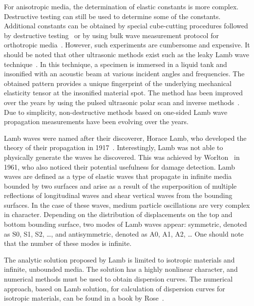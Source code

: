 \documentclass[preprint,12pt]{elsarticle}
\begin{document}
	For anisotropic media, the determination of elastic constants is more complex. Destructive testing can still be used to determine some of the constants. Additional constants can be obtained by special cube-cutting procedures followed by destructive testing~\cite{Rose1991} or by using bulk wave measurement protocol for orthotropic media~\cite{Rose1999}. However, such experiments are cumbersome and expensive.  It should be noted that other ultrasonic methods exist such as the leaky Lamb wave technique~\cite{Karim1990,Karim1990a}. In this technique, a specimen is immersed in a liquid tank and insonified with an acoustic beam at various incident angles and frequencies. The obtained pattern provides a unique fingerprint of the underlying mechanical elasticity tensor at the insonified material spot. The method has been improved over the years by using the pulsed ultrasonic polar scan and inverse methods~\cite{Kersemans2014,Martens2017}. Due to simplicity, non-destructive methods based on one-sided Lamb wave propagation measurements have been evolving over the years.

	Lamb waves were named after their discoverer, Horace Lamb, who developed the theory of their propagation in 1917~\cite{Lamb1917}. Interestingly, Lamb was not able to physically generate the waves he discovered. This was achieved by Worlton~\cite{Worlton1961} in 1961, who also noticed their potential usefulness for damage detection. Lamb waves are defined as a type of elastic waves that propagate in infinite media bounded by two surfaces and arise as a result of the superposition of multiple reflections of longitudinal waves and shear vertical waves from the bounding surfaces. In the case of these waves, medium particle oscillations are very complex in character. Depending on the distribution of displacements on the top and bottom bounding surface, two modes of Lamb waves appear: symmetric, denoted as S0, S1, S2, …, and antisymmetric, denoted as A0, A1, A2, … One should note that the number of these modes is infinite.

	The analytic solution proposed by Lamb is limited to isotropic materials and infinite, unbounded media. The solution has a highly nonlinear character, and numerical methods must be used to obtain dispersion curves. The numerical approach, based on Lamb solution, for calculation of dispersion curves for isotropic materials, can be found in a book by Rose~\cite{Rose1999}.
\end{document}
